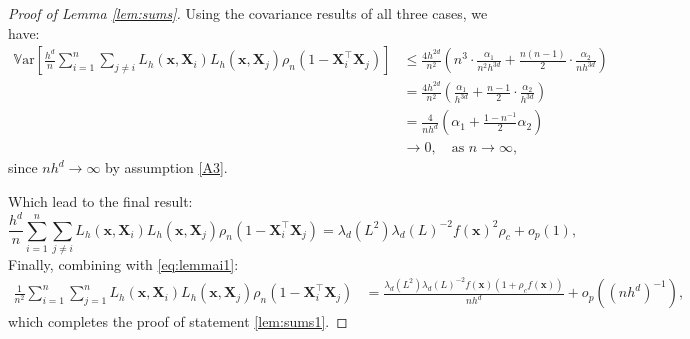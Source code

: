 \documentclass[12pt]{report} %
\newcommand{\bX}{\mathbf{X}}
\newcommand{\bx}{\mathbf{x}}
\newcommand{\lc}{\left[}
\newcommand{\rc}{\right]}
\newcommand{\V}[1]{\mathbb{V}\mathrm{ar}\lc #1\rc}
\begin{document}
\begin{proof}[Proof of Lemma \ref{lem:sums}]
Using the covariance results of all three cases, we have:
\begin{align*}
\V{\frac{h^d}{n}\sum_{i=1}^n\sum_{j\neq i}
L_h(\bx,\bX_i)L_h(\bx,\bX_j)\rho_n(1-\bX_i^\top\bX_j)}
&\leq \frac{4h^{2d}}{n^2}\left(
n^3 \cdot \frac{\alpha_1}{n^2 h^{3d}} 
+ \frac{n(n-1)}{2} \cdot \frac{\alpha_2}{n h^{3d}}
\right) \\
&= \frac{4h^{2d}}{n^2}\left(
\frac{\alpha_1}{h^{3d}} 
+ \frac{n-1}{2}\cdot\frac{\alpha_2}{h^{3d}}
\right) \\
&= \frac{4}{nh^d}\left(\alpha_1 + \frac{1-n^{-1}}{2}\alpha_2\right) \\
&\longrightarrow 0, \quad \text{as } n \to \infty,
\end{align*}
since $nh^d \to \infty$ by assumption \ref{A3}.

Which lead to the final result:
\begin{equation*}
\frac{h^d}{n}\sum_{i=1}^n\sum_{j\neq i}
L_h(\bx,\bX_i)L_h(\bx,\bX_j)\rho_n(1-\bX_i^\top\bX_j)
= \lambda_d(L^2)\lambda_d(L)^{-2}f(\bx)^2\rho_c + o_p(1),
\end{equation*}
Finally, combining with \eqref{eq:lemmai1}:
\begin{align*}
\frac{1}{n^2}\sum_{i=1}^n\sum_{j=1}^n
L_h(\bx,\bX_i)L_h(\bx,\bX_j)\rho_n(1-\bX_i^\top\bX_j)
&= \frac{\lambda_d(L^2)\lambda_d(L)^{-2}f(\bx)
\left(1 + \rho_c f(\bx)\right)}{nh^d}
+ o_p\!\left((nh^d)^{-1}\right),
\end{align*}
which completes the proof of statement \ref{lem:sums1}. 




\end{proof}
\end{document}
